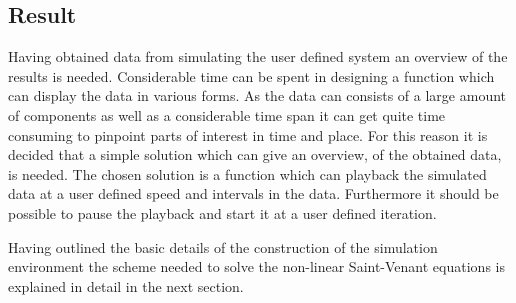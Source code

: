 \subsection*{Result}

Having obtained data from simulating the user defined system an overview of the results is needed. Considerable time can be spent in designing a function which can display the data in various forms. As the data can consists of a large amount of components as well as a considerable time span it can get quite time consuming to pinpoint parts of interest in time and place. For this reason it is decided that a simple solution which can give an overview, of the obtained data, is needed. The chosen solution is a function which can playback the simulated data at a user defined speed and intervals in the data. Furthermore it should be possible to pause the playback and start it at a user defined iteration.    




Having outlined the basic details of the construction of the simulation environment the scheme needed to solve the non-linear Saint-Venant equations is explained in detail in the next section.   
